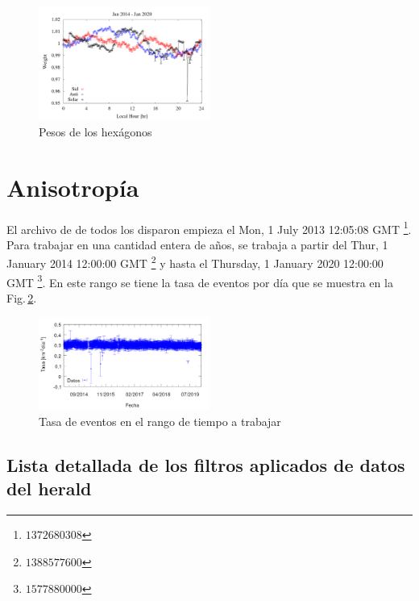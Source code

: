 \begin{figure}[H]
	\centering
	\includegraphics[width=0.5\textwidth]{weigth2014-2020_jan.png} 	
	\caption{Pesos de los hexágonos}
	\label{fig:wei_14_20}
\end{figure}

\section{Anisotropía}
El archivo de de todos los disparon empieza el Mon, 1 July 2013 12:05:08 GMT \footnote{$1372680308$}. Para trabajar en una cantidad entera de años, se trabaja a partir del  Thur, 1 January 2014 12:00:00 GMT \footnote{$1388577600$} y hasta el Thursday, 1 January 2020 12:00:00 GMT \footnote{$1577880000$}.  En este rango se tiene la tasa de eventos por día que se muestra en la Fig.\,\ref{tasa_total_diaria}.


\begin{figure}[H]
	\centering
	\includegraphics[width=0.5\textwidth]{rate_total.png}
	\caption{Tasa  de eventos en el rango de tiempo a trabajar}
	\label{tasa_total_diaria}
\end{figure}

\subsection{Lista detallada de los filtros aplicados de datos del herald}

